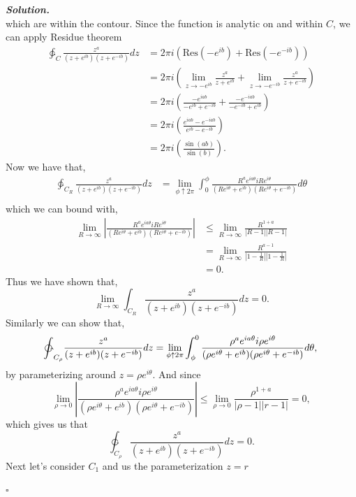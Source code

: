 \documentclass[12pt]{report}
\newenvironment{solution}[1][\it{Solution}]{\textbf{#1. } }{$\square$}
\newcommand{\paren}[1]{{\left(#1\right)}} %
\newcommand{\abs}[1]{{\left|#1\right|}} %
\def\ointcc{{\ointctrclockwise}}
\begin{document}
\begin{solution}
\[    \]
    which are within the contour. 
    Since the function is analytic on and within $C$, we can apply Residue theorem
    \begin{align*}
        \ointcc_C \frac{z^a}{(z + e^{ib})(z + e^{-ib})}dz &= 2\pi i \paren{\text{Res}(-e^{ib}) + \text{Res}(-e^{-ib})}\\
        &=2\pi i \paren{\lim_{z \to -e^{ib}} \frac{z^a}{z + e^{ib}} + \lim_{z \to -e^{-ib}} \frac{z^a}{z + e^{-ib}}}\\
        &=2\pi i \paren{\frac{-e^{iab}}{-e^{ib} + e^{-ib}} + \frac{-e^{-iab}}{-e^{-ib} + e^{ib}}}\\
        &= 2\pi i \paren{\frac{e^{iab} - e^{-iab}}{e^{ib} - e^{-ib}}}\\
        &= 2\pi i \paren{\frac{\sin(ab)}{\sin(b)}}.
    \end{align*}
    Now we have that,
    \begin{align*}
        \ointcc_{C_R} \frac{z^a}{(z + e^{ib})(z + e^{-ib})}dz &= \lim_{\phi \uparrow 2\pi} \int_0^\phi \frac{R^a e^{ia\theta} i Re^{i\theta}}{(Re^{i\theta} + e^{ib})(Re^{i\theta} + e^{-ib})}d\theta\\
    \end{align*}
    which we can bound with,
    \begin{align*}
        \lim_{R \to \infty} \abs{\frac{R^a e^{ia\theta} i Re^{i\theta}}{(Re^{i\theta} + e^{ib})(Re^{i\theta} + e^{-ib})}} &\leq \lim_{R \to \infty} \frac{R^{1 + a}}{|R - 1||R - 1|}\\
        &= \lim_{R \to \infty} \frac{R^{a-1}}{\abs{1 - \frac{1}{R}}\abs{1 - \frac{1}{R}}}\\
        &=0.
    \end{align*}
    Thus we have shown that,
    \[ 
        \lim_{R \to \infty} \int_{C_R} \frac{z^a}{(z + e^{ib})(z + e^{-ib})}dz = 0.
    \]
    Similarly we can show that,
    \[ 
        \ointcc_{C_\rho} \frac{z^a}{(z + e^{ib})(z + e^{-ib})}dz = \lim_{\phi \uparrow 2\pi} \int^0_\phi \frac{\rho^a e^{ia\theta} i \rho e^{i\theta}}{(\rho e^{i\theta} + e^{ib})(\rho e^{i\theta} + e^{-ib})}d\theta,\\
    \]
    by parameterizing around $z = \rho e^{i \theta}.$ And since
    \[ 
        \lim_{\rho \to 0} \abs{\frac{\rho^a e^{ia\theta} i \rho e^{i\theta}}{(\rho e^{i\theta} + e^{ib})(\rho e^{i\theta} + e^{-ib})}} \leq \lim_{\rho \to 0} \frac{\rho^{1 + a}}{\abs{\rho - 1}\abs{r- 1}} = 0,
    \]
    which gives us that
    \[\ointcc_{C_\rho} \frac{z^a}{(z + e^{ib})(z + e^{-ib})}dz = 0.\]
    Next let's consider $C_1$ and us the parameterization $z=r$

\end{solution}
\end{document}
